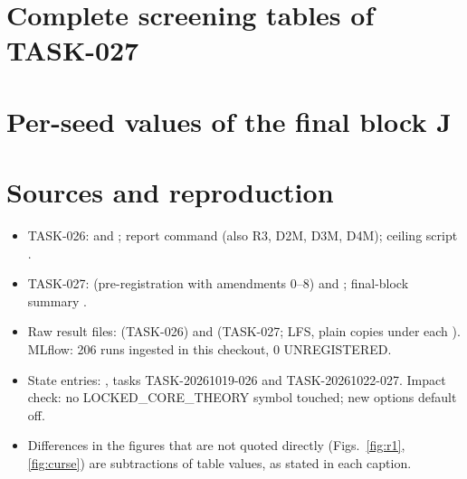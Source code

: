\documentclass[10pt,a4paper]{article}
\begin{document}
\appendix
\section{Complete screening tables of TASK-027}\label{app:screens}
\small

\normalsize

\section{Per-seed values of the final block J}


\section{Sources and reproduction}
\small\sloppy
\begin{itemize}\itemsep1pt
\item TASK-026:  and ; report command  (also R3, D2M, D3M, D4M); ceiling script .
\item TASK-027:  (pre-registration with amendments 0--8) and ; final-block summary .
\item Raw result files:  (TASK-026) and  (TASK-027; LFS, plain copies under each ). MLflow: 206 runs ingested in this checkout, 0 UNREGISTERED.
\item State entries: , tasks TASK-20261019-026 and TASK-20261022-027. Impact check: no LOCKED\_CORE\_THEORY symbol touched; new options default off.
\item Differences in the figures that are not quoted directly (Figs.~\ref{fig:r1}, \ref{fig:curse}) are subtractions of table values, as stated in each caption.
\end{itemize}
\end{document}
